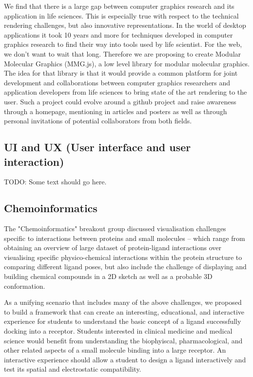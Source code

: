 \documentclass[a4paper]{article}
\begin{document}
We find that there is a large gap between computer graphics research and its application in life sciences. This is especially true with respect to the technical rendering challenges, but also innovative representations. In the world of desktop applications it took 10 years and more for techniques developed in computer graphics research to find their way into tools used by life scientist. For the web, we don't want to wait that long. Therefore we are proposing to create Modular Molecular Graphics (MMG.js), a low level library for modular molecular graphics. The idea for that library is that it would provide a common platform for joint development and collaborations between computer graphics researchers and application developers from life sciences to bring state of the art rendering to the user. Such a project could evolve around a github project and raise awareness through a homepage, mentioning in articles and posters as well as through personal invitations of potential collaborators from both fields.

\subsection{UI and UX (User interface and user interaction)}

TODO: Some text should go here.


\subsection{Chemoinformatics}

The "Chemoinformatics" breakout group discussed visualisation challenges specific to interactions between proteins and small molecules -- which range from obtaining an overview of large dataset of protein-ligand interactions over visualising specific physico-chemical interactions within the protein structure to comparing different ligand poses, but also include the challenge of displaying and building chemical compounds in a 2D sketch as well as a probable 3D conformation. 

As a unifying scenario that includes many of the above challenges, we proposed to build a framework that can create an interesting, educational, and interactive experience for students to understand the basic concept of a ligand successfully docking into a receptor.  Students interested in clinical medicine and medical science would benefit from understanding the biophyiscal, pharmacological, and other related aspects of a small molecule binding into a large receptor. An interactive experience should allow a student to design a ligand interactively and test its spatial and electrostatic compatibility.
\end{document}
